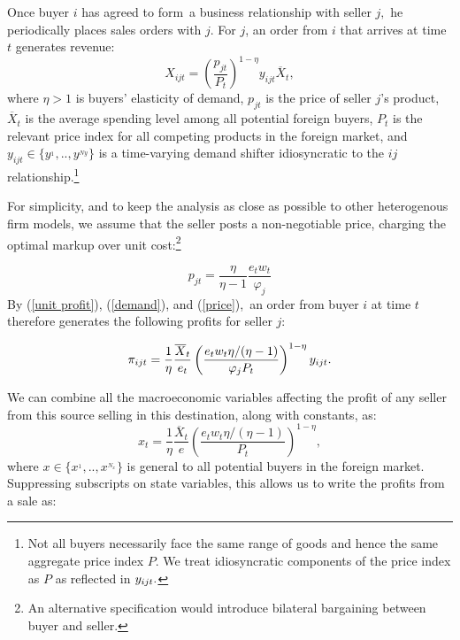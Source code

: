 Once buyer $i$ has agreed to form\ a business relationship with seller $j,$
he periodically places sales orders with $j$. For $j$, an order from $i$
that arrives at time $t$ generates revenue:%
\begin{equation}
X_{ijt}=\left( \frac{p_{jt}}{P_{t}}\right) ^{1-\eta }y_{ijt}\overline{X}_{t},
\label{demand}
\end{equation}%
where $\eta >1$ is buyers' elasticity of demand, $p_{jt}$ is the price of
seller $j$'s product, $\overline{X}_{t}$ is the average spending level among
all potential foreign buyers, $P_{t}$ is the relevant price index for all
competing products in the foreign market, and $y_{ijt}\in
\{y^{_{1}},..,y^{_{Ny}}\}$ is a time-varying demand shifter idiosyncratic to
the $ij$ relationship.\footnote{%
Not all buyers necessarily face the same range of goods and hence the same
aggregate price index $P$. We treat idiosyncratic components of the price
index as $P$ as reflected in $y_{ijt}.\medskip $}

For simplicity, and to keep the analysis as close as possible to other
heterogenous firm models, we assume that the seller posts a non-negotiable
price, charging the optimal markup over unit cost:\footnote{%
An alternative specification would introduce bilateral bargaining between
buyer and seller.\medskip}

\begin{equation}
p_{jt}=\frac{\eta }{\eta -1}\frac{e_{t}w_{t}}{\varphi _{j}}  \label{price}
\end{equation}%
By (\ref{unit profit}), (\ref{demand}), and (\ref{price}),\ an order from
buyer $i$ at time $t$ therefore generates the following profits for seller $%
j $:

\begin{equation*}
\pi _{ijt}=\frac{1}{\eta }\frac{\overline{X}_{t}}{e_{t}}\left( \frac{%
e_{t}w_{t}\eta /(\eta -1)}{\varphi _{j}P_{t}}\right) ^{1-\eta }y_{ijt}.
\end{equation*}

We can combine all the macroeconomic variables affecting the profit of any
seller from this source selling in this destination, along with constants,
as:%
\begin{equation*}
x_{t}=\frac{1}{\eta }\frac{\overline{X}_{t}}{e}\left( \frac{e_{t}w_{t}\eta
/(\eta -1)}{P_{t}}\right) ^{1-\eta },
\end{equation*}%
where $x\in \{x^{_{1}},..,x^{_{N_{x}}}\}$ is general to all potential buyers
in the foreign market. Suppressing subscripts on state variables, this
allows us to write the profits from a sale as:

